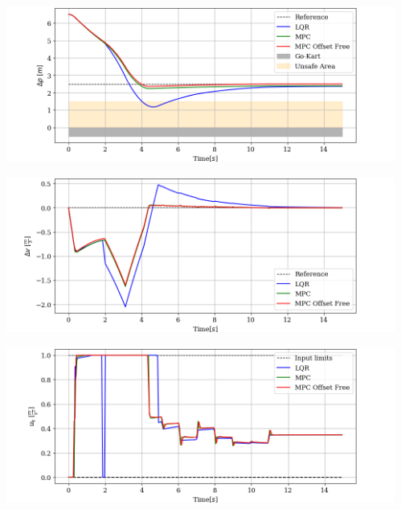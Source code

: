\documentclass[9pt, aspectratio=169]{beamer}
\begin{document}
\begin{frame}
\begin{columns}
\begin{column}{0.57\textwidth}
\end{column}
\begin{column}{0.43\textwidth}
	\begin{center}
  		\includegraphics[width=1\textwidth]{Ta_Lou/Deltap} 
	\end{center}
	\vspace{-0.4cm}
	\begin{center}
  		\includegraphics[width=1\textwidth]{Ta_Lou/Deltav} 
	\end{center}
	\vspace{-0.4cm}
	\begin{center}
  		\includegraphics[width=1\textwidth]{Ta_Lou/Input} 
	\end{center}
\end{column}
\end{columns}
\end{frame}
\end{document}
